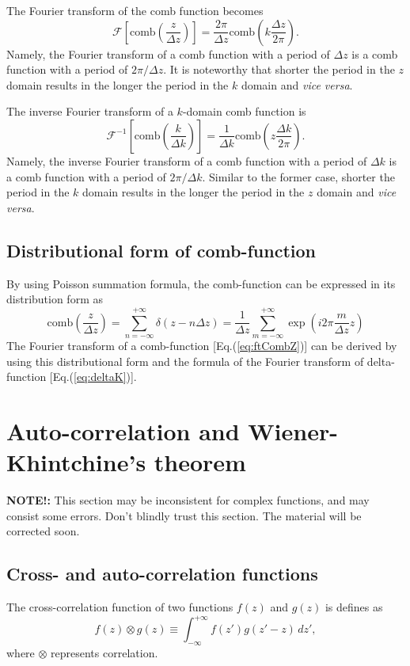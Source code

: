 \documentclass[a4paper]{article}
\newcommand{\ftf}[1]{{\mathcal{F}\left[#1\right]\xspace}}
\newcommand{\iftf}[1]{{\mathcal{F}^{-1}\left[#1\right]\xspace}}
\newcommand{\comb}[1]{{\mathrm{comb}\left( #1 \right)}\xspace}
\newcommand{\Dz}{{\Delta z}\xspace}
\newcommand{\Dk}{{\Delta k}\xspace}
\newcommand{\vcvs}{{\textit{vice versa}\xspace}}
\begin{document}
The Fourier transform of the comb function becomes
\begin{equation}
	\label{eq:ftCombZ}
	\ftf{ \comb{\frac{z}{\Dz}} }  = \frac{2\pi}{\Dz} \comb{k\frac{\Dz}{2 \pi}}.
\end{equation}
Namely, the Fourier transform of a comb function with a period of $\Delta z$ is a comb function with a period of $2\pi/\Dz$.
It is noteworthy that shorter the period in the $z$ domain results in the longer the period in the $k$ domain and \vcvs.

The inverse Fourier transform of a $k$-domain comb function is
\begin{equation}
	\iftf{\comb{\frac{k}{\Dk}}} = \frac{1}{\Dk} \comb{z\frac{\Dk}{2\pi}}.
\end{equation}
Namely, the inverse Fourier transform of a comb function with a period of $\Dk$ is a comb function with a period of $2\pi/\Dk$.
Similar to the former case, shorter the period in the $k$ domain results in the longer the period in the $z$ domain and \vcvs.

\subsection{Distributional form of comb-function}
By using Poisson summation formula, the comb-function can be expressed in its distribution form as
\begin{equation}
	\comb{\frac{z}{\Dz}} 
	= \sum_{n = -\infty}^{+\infty} \delta\left( z-n\Dz \right)
	= \frac{1}{\Dz} \sum_{m=-\infty}^{+\infty} \exp\left(i2\pi \frac{m}{\Dz} z\right)
\end{equation}
The Fourier transform of a comb-function [Eq.\@ (\ref{eq:ftCombZ})] can be derived by using this distributional form and the formula of the Fourier transform of delta-function [Eq.\@ (\ref{eq:deltaK})].

\section{Auto-correlation and Wiener-Khintchine’s theorem}
{\bf NOTE!:}
This section may be inconsistent for complex functions, and may consist some errors.
Don't blindly trust this section.
The material will be corrected soon.
\subsection{Cross- and auto-correlation functions}
The cross-correlation function of two functions $f(z)$ and $g(z)$ is defines as
\begin{equation}
	f(z) \otimes g(z) \equiv \int_{-\infty}^{+\infty} f(z') g(z'-z)\, dz',
\end{equation}
where $\otimes$ represents correlation.
\end{document}
